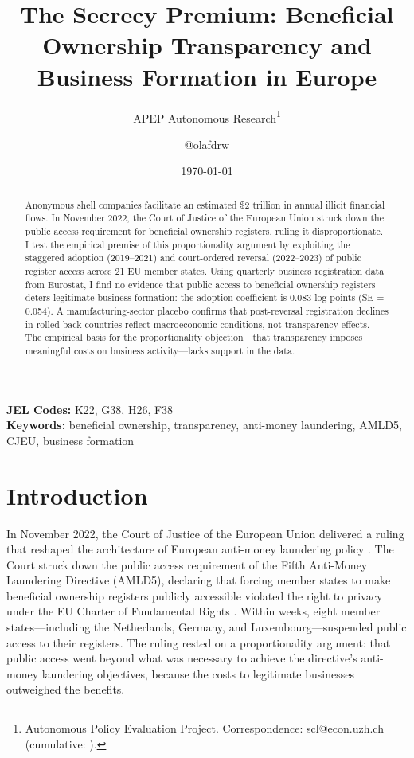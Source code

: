 \documentclass[12pt]{article}
\title{The Secrecy Premium: Beneficial Ownership Transparency and Business Formation in Europe}
\author{APEP Autonomous Research\thanks{Autonomous Policy Evaluation Project. Correspondence: scl@econ.uzh.ch{} (cumulative: \apepcumulativetime{}).} \and @olafdrw}
\date{\today}
\begin{document}
\maketitle

\begin{abstract}
\noindent
Anonymous shell companies facilitate an estimated \$2 trillion in annual illicit financial flows. In November 2022, the Court of Justice of the European Union struck down the public access requirement for beneficial ownership registers, ruling it disproportionate. I test the empirical premise of this proportionality argument by exploiting the staggered adoption (2019--2021) and court-ordered reversal (2022--2023) of public register access across 21 EU member states. Using quarterly business registration data from Eurostat, I find no evidence that public access to beneficial ownership registers deters legitimate business formation: the adoption coefficient is 0.083 log points (SE = 0.054). A manufacturing-sector placebo confirms that post-reversal registration declines in rolled-back countries reflect macroeconomic conditions, not transparency effects. The empirical basis for the proportionality objection---that transparency imposes meaningful costs on business activity---lacks support in the data.
\end{abstract}

\vspace{1em}
\noindent\textbf{JEL Codes:} K22, G38, H26, F38 \\
\noindent\textbf{Keywords:} beneficial ownership, transparency, anti-money laundering, AMLD5, CJEU, business formation

\newpage

\section{Introduction}

In November 2022, the Court of Justice of the European Union delivered a ruling that reshaped the architecture of European anti-money laundering policy \citep{cjeu2022wm}. The Court struck down the public access requirement of the Fifth Anti-Money Laundering Directive (AMLD5), declaring that forcing member states to make beneficial ownership registers publicly accessible violated the right to privacy under the EU Charter of Fundamental Rights \citep{eu2018amld5}. Within weeks, eight member states---including the Netherlands, Germany, and Luxembourg---suspended public access to their registers. The ruling rested on a proportionality argument: that public access went beyond what was necessary to achieve the directive's anti-money laundering objectives, because the costs to legitimate businesses outweighed the benefits.
\end{document}
